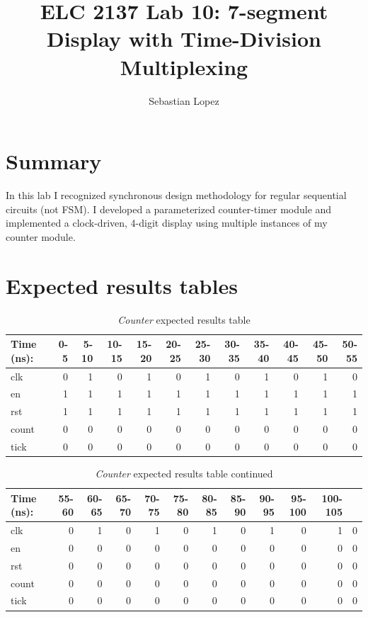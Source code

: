 \documentclass[11pt]{article}
\begin{document}
\title{ELC 2137 Lab 10: 7-segment Display with Time-Division Multiplexing}
\author{Sebastian Lopez}
\maketitle

\section*{Summary}

In this lab I recognized synchronous design methodology for regular sequential circuits (not FSM). I developed a parameterized counter-timer module and implemented a clock-driven, 4-digit display using multiple instances of my counter module. 

\section*{Expected results tables}

\begin{table}[ht]\centering
	\caption{\textit{Counter} expected results table}
	\label{ALU:tbl:register_ERT}\medskip
	\begin{tabular}{l|rrrrrrrrrrr}
		Time (ns): & 0-5 & 5-10 & 10-15 & 15-20 & 20-25 & 25-30 & 30-35 & 35-40 & 40-45 & 45-50 & 50-55 \\
		\midrule
		clk & 0 & 1 & 0 & 1 & 0 & 1 & 0 & 1 & 0 & 1 & 0 \\
		en & 1 & 1 & 1 & 1 & 1 & 1 & 1 & 1 & 1 & 1 & 1 \\
		rst & 1 & 1 & 1 & 1 & 1 & 1 & 1 & 1 & 1 & 1 & 1 \\
		count & 0 & 0 & 0 & 0 & 0 & 0 & 0 & 0 & 0 & 0 & 0 \\
		tick & 0 & 0 & 0 & 0 & 0 & 0 & 0 & 0 & 0 & 0 & 0 \\
		\bottomrule
	\end{tabular}
\end{table}

\begin{table}[ht]\centering
	\caption{\textit{Counter} expected results table continued}
	\label{ALU:tbl:register_ERT}\medskip
	\begin{tabular}{l|rrrrrrrrrrr}
		Time (ns): & 55-60 & 60-65 & 65-70 & 70-75 & 75-80 & 80-85 & 85-90 & 90-95 & 95-100 & 100-105 & \\
		\midrule
		clk & 0 & 1 & 0 & 1 & 0 & 1 & 0 & 1 & 0 & 1 & 0 \\
		en & 0 & 0 & 0 & 0 & 0 & 0 & 0 & 0 & 0 & 0 & 0 \\
		rst & 0 & 0 & 0 & 0 & 0 & 0 & 0 & 0 & 0 & 0 & 0 \\
		count & 0 & 0 & 0 & 0 & 0 & 0 & 0 & 0 & 0 & 0 & 0 \\
		tick & 0 & 0 & 0 & 0 & 0 & 0 & 0 & 0 & 0 & 0 & 0 \\
		\bottomrule
	\end{tabular}
\end{table}
\end{document}
